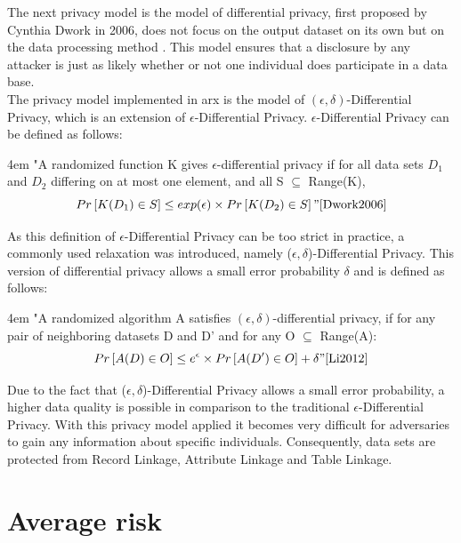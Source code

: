 \documentclass[12pt, a4paper,oneside]{report}
\begin{document}
The next privacy model is the model of differential privacy, first proposed by Cynthia Dwork in 2006, does not focus on the output dataset on its own but on the data processing method \cite{Dwork2006, dataanonymizationtool}. This model ensures that a disclosure by any attacker is just as likely whether or not one individual does participate in a data base\cite{Dwork2006}.\\
The privacy model implemented in arx is the model of $(\epsilon, \delta)$-Differential Privacy, which is an extension of $\epsilon$-Differential Privacy. $\epsilon$-Differential Privacy can be defined as follows:\\
\par
\begingroup
\leftskip4em
\rightskip\leftskip
"A randomized function K gives $\epsilon$-differential privacy if for all data sets $D_1$ and $D_2$ differing on at most one element, and all S $\subseteq$ Range(K),
\[Pr\left[K(D_1) \in S\right] \le exp(\epsilon) \times Pr\left[K(D_2) \in S\right]"\cite{Dwork2006}\]
\par
\endgroup

As this definition of $\epsilon$-Differential Privacy can be too strict in practice, a commonly used relaxation was introduced, namely ($\epsilon, \delta$)-Differential Privacy. This version of differential privacy allows a small error probability $\delta$ and is defined as follows\cite{Li2012}: \\
\par
\begingroup
\leftskip4em
\rightskip\leftskip
"A randomized algorithm A satisfies $(\epsilon, \delta)$-differential privacy, if for any pair of neighboring datasets D and D' and for any O $\subseteq$ Range(A):
\[Pr\left[A(D) \in O\right] \le e^\epsilon \times Pr\left[A(D') \in O\right] + \delta"\cite{Li2012}\]
\par
\endgroup
Due to the fact that ($\epsilon, \delta$)-Differential Privacy allows a small error probability, a higher data quality is possible in comparison to the traditional $\epsilon$-Differential Privacy\cite{Bild2018}.
With this privacy model applied it becomes very difficult for adversaries to gain any information about specific individuals. Consequently, data sets are protected from Record Linkage, Attribute Linkage and Table Linkage\cite{dataanonymizationtool}.

\section{Average risk}
\end{document}
